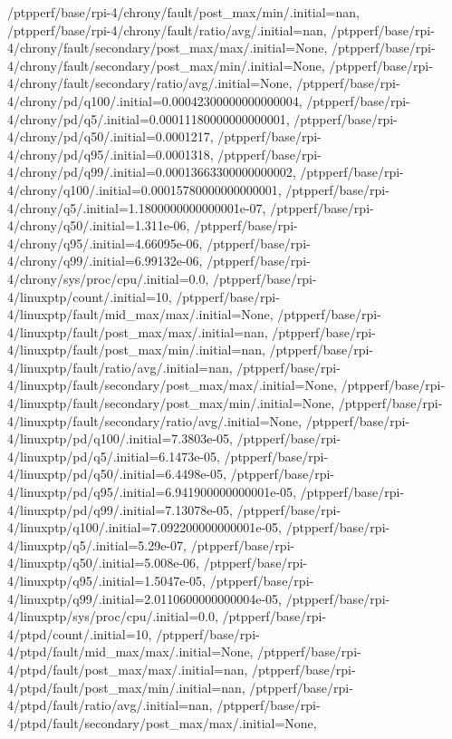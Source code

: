 {    /ptpperf/base/rpi-4/chrony/fault/post_max/min/.initial=nan,
    /ptpperf/base/rpi-4/chrony/fault/ratio/avg/.initial=nan,
    /ptpperf/base/rpi-4/chrony/fault/secondary/post_max/max/.initial=None,
    /ptpperf/base/rpi-4/chrony/fault/secondary/post_max/min/.initial=None,
    /ptpperf/base/rpi-4/chrony/fault/secondary/ratio/avg/.initial=None,
    /ptpperf/base/rpi-4/chrony/pd/q100/.initial=0.00042300000000000004,
    /ptpperf/base/rpi-4/chrony/pd/q5/.initial=0.00011180000000000001,
    /ptpperf/base/rpi-4/chrony/pd/q50/.initial=0.0001217,
    /ptpperf/base/rpi-4/chrony/pd/q95/.initial=0.0001318,
    /ptpperf/base/rpi-4/chrony/pd/q99/.initial=0.00013663300000000002,
    /ptpperf/base/rpi-4/chrony/q100/.initial=0.00015780000000000001,
    /ptpperf/base/rpi-4/chrony/q5/.initial=1.1800000000000001e-07,
    /ptpperf/base/rpi-4/chrony/q50/.initial=1.311e-06,
    /ptpperf/base/rpi-4/chrony/q95/.initial=4.66095e-06,
    /ptpperf/base/rpi-4/chrony/q99/.initial=6.99132e-06,
    /ptpperf/base/rpi-4/chrony/sys/proc/cpu/.initial=0.0,
    /ptpperf/base/rpi-4/linuxptp/count/.initial=10,
    /ptpperf/base/rpi-4/linuxptp/fault/mid_max/max/.initial=None,
    /ptpperf/base/rpi-4/linuxptp/fault/post_max/max/.initial=nan,
    /ptpperf/base/rpi-4/linuxptp/fault/post_max/min/.initial=nan,
    /ptpperf/base/rpi-4/linuxptp/fault/ratio/avg/.initial=nan,
    /ptpperf/base/rpi-4/linuxptp/fault/secondary/post_max/max/.initial=None,
    /ptpperf/base/rpi-4/linuxptp/fault/secondary/post_max/min/.initial=None,
    /ptpperf/base/rpi-4/linuxptp/fault/secondary/ratio/avg/.initial=None,
    /ptpperf/base/rpi-4/linuxptp/pd/q100/.initial=7.3803e-05,
    /ptpperf/base/rpi-4/linuxptp/pd/q5/.initial=6.1473e-05,
    /ptpperf/base/rpi-4/linuxptp/pd/q50/.initial=6.4498e-05,
    /ptpperf/base/rpi-4/linuxptp/pd/q95/.initial=6.941900000000001e-05,
    /ptpperf/base/rpi-4/linuxptp/pd/q99/.initial=7.13078e-05,
    /ptpperf/base/rpi-4/linuxptp/q100/.initial=7.092200000000001e-05,
    /ptpperf/base/rpi-4/linuxptp/q5/.initial=5.29e-07,
    /ptpperf/base/rpi-4/linuxptp/q50/.initial=5.008e-06,
    /ptpperf/base/rpi-4/linuxptp/q95/.initial=1.5047e-05,
    /ptpperf/base/rpi-4/linuxptp/q99/.initial=2.0110600000000004e-05,
    /ptpperf/base/rpi-4/linuxptp/sys/proc/cpu/.initial=0.0,
    /ptpperf/base/rpi-4/ptpd/count/.initial=10,
    /ptpperf/base/rpi-4/ptpd/fault/mid_max/max/.initial=None,
    /ptpperf/base/rpi-4/ptpd/fault/post_max/max/.initial=nan,
    /ptpperf/base/rpi-4/ptpd/fault/post_max/min/.initial=nan,
    /ptpperf/base/rpi-4/ptpd/fault/ratio/avg/.initial=nan,
    /ptpperf/base/rpi-4/ptpd/fault/secondary/post_max/max/.initial=None,
}
